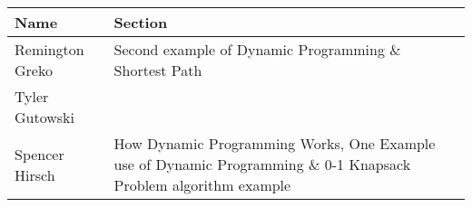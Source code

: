 \documentclass{article}
\begin{document}
\pagebreak

\begin{center}
        \begin{tabular}{|p{3cm}|p{6cm}|}
            \hline
            \textbf{Name} & \textbf{Section} \\
            \hline
            Remington Greko & Second example of Dynamic Programming $\&$ Shortest Path\\
            \hline
            Tyler Gutowski &  \\
            \hline
            Spencer Hirsch & How Dynamic Programming Works, One Example use of Dynamic Programming $\&$ 0-1 Knapsack Problem algorithm example \\
            \hline
        \end{tabular}
    \end{center}
    
\end{document}
